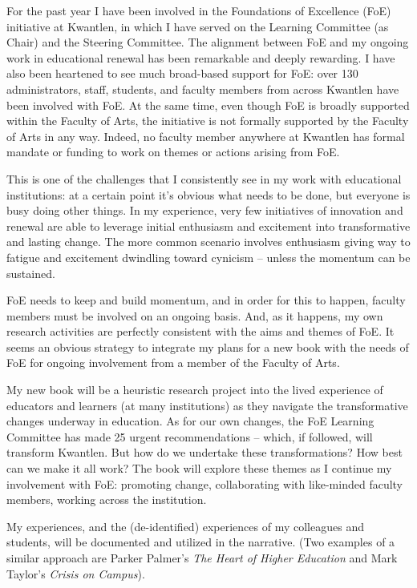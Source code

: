 \documentclass[letterpaper,10pt,headsepline]{scrreprt}
\begin{document}
For the past year I have been involved in the Foundations of Excellence (FoE) initiative at Kwantlen, in which I have served on the Learning Committee (as Chair) and the Steering Committee. The alignment between FoE and my ongoing work in educational renewal has been remarkable and deeply rewarding. I have also been heartened to see much broad-based support for FoE: over 130 administrators, staff, students, and faculty members from across Kwantlen have been involved with FoE. At the same time, even though FoE is broadly supported within the Faculty of Arts, the initiative is not formally supported by the Faculty of Arts in any way. Indeed, no faculty member anywhere at Kwantlen has formal mandate or funding to work on themes or actions arising from FoE.

This is one of the challenges that I consistently see in my work with educational institutions: at a certain point it's obvious what needs to be done, but everyone is busy doing other things. In my experience, very few initiatives of innovation and renewal are able to leverage initial enthusiasm and excitement into transformative and lasting change. The more common scenario involves enthusiasm giving way to fatigue and excitement dwindling toward cynicism -- unless the momentum can be sustained.

FoE needs to keep and build momentum, and in order for this to happen, faculty members must be involved on an ongoing basis. And, as it happens, my own research activities are perfectly consistent with the aims and themes of FoE. It seems an obvious strategy to integrate my plans for a new book with the needs of FoE for ongoing involvement from a member of the Faculty of Arts.

My new book will be a heuristic research project into the lived experience of educators and learners (at many institutions) as they navigate the transformative changes underway in education. As for our own changes, the FoE Learning Committee has made 25 urgent recommendations -- which, if followed, will transform Kwantlen. But how do we undertake these transformations? How best can we make it all work? The book will explore these themes as I continue my involvement with FoE: promoting change, collaborating with like-minded faculty members, working across the institution.

My experiences, and the (de-identified) experiences of my colleagues and students, will be documented and utilized in the narrative. (Two examples of a similar approach are Parker Palmer's \emph{The Heart of Higher Education} and Mark Taylor's \emph{Crisis on Campus}).
\end{document}
